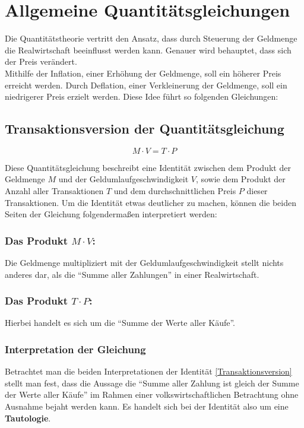 \section{Allgemeine Quantitätsgleichungen}

Die Quantitätstheorie vertritt den Ansatz, dass durch Steuerung der Geldmenge die Realwirtschaft beeinflusst werden kann. Genauer wird behauptet, dass sich der Preis verändert. \\
Mithilfe der Inflation, einer Erhöhung der Geldmenge, soll ein höherer Preis erreicht werden. Durch Deflation, einer Verkleinerung der Geldmenge, soll ein niedrigerer Preis erzielt werden. Diese Idee führt so folgenden Gleichungen:
\subsection{Transaktionsversion der Quantitätsgleichung}
\begin{equation}
    \tag{Transaktionsversion}
    M \cdot V = T \cdot P
\end{equation}\label{Transaktionsversion}

Diese Quantitätsgleichung beschreibt eine Identität zwischen dem Produkt der Geldmenge $M$ und der Geldumlaufgeschwindigkeit $V$, sowie dem Produkt der Anzahl aller Transaktionen $T$ und dem durchschnittlichen Preis $P$ dieser Transaktionen. Um die Identität etwas deutlicher zu machen, können die beiden Seiten der Gleichung folgendermaßen interpretiert werden:

\subsubsection*{Das Produkt $M \cdot V$:}
Die Geldmenge multipliziert mit der Geldumlaufgeschwindigkeit stellt nichts anderes dar, als die \enquote{Summe aller Zahlungen} in einer Realwirtschaft.

\subsubsection*{Das Produkt $T \cdot P$:}
Hierbei handelt es sich um die \enquote{Summe der Werte aller Käufe}.

\subsubsection*{Interpretation der Gleichung}
Betrachtet man die beiden Interpretationen der Identität \vref{Transaktionsversion} stellt man fest, dass die Aussage die \enquote{Summe aller Zahlung ist gleich der Summe der Werte aller Käufe} im Rahmen einer volkswirtschaftlichen Betrachtung ohne Ausnahme bejaht werden kann. Es handelt sich bei der Identität also um eine \textbf{Tautologie}.

